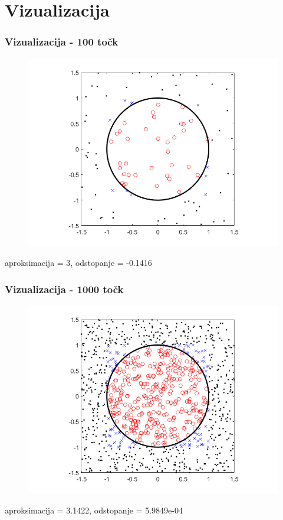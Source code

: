 \documentclass{beamer}
\begin{document}
\section{Vizualizacija}
\begin{frame}
\frametitle{Vizualizacija - 100 točk}

\begin{figure}
  \centering
  \includegraphics[width = 0.6 \linewidth]{100.png}
\end{figure}
\centering
aproksimacija = 3, odstopanje = -0.1416

\end{frame}

\begin{frame}
\frametitle{Vizualizacija - 1000 točk}

\begin{figure}
  \centering
  \includegraphics[width = 0.6 \linewidth]{1000.png}
\end{figure}
\centering
aproksimacija = 3.1422, odstopanje = 5.9849e-04

\end{frame}
\end{document}
